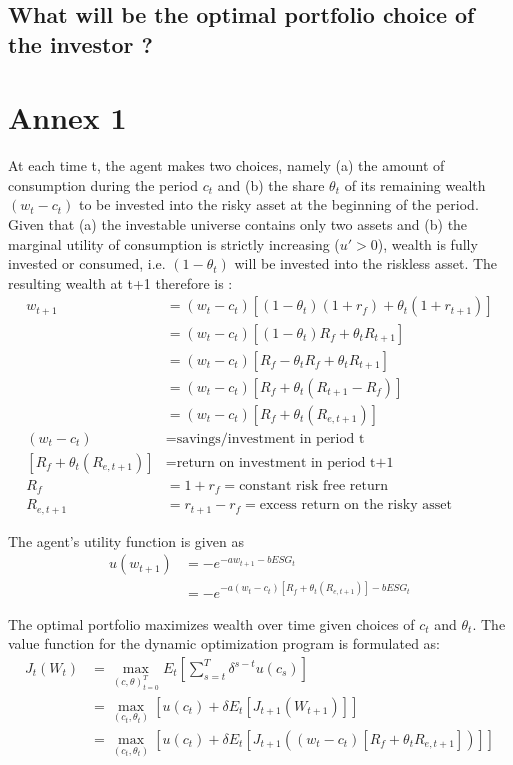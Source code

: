 \documentclass[]{article}
\begin{document}
\subsection{What will be the optimal portfolio choice of the investor ?}


\section{Annex 1}
At each time t, the agent makes two choices, namely (a) the amount of consumption during the period $c_t$ and (b) the share $\theta_t$ of its remaining wealth $(w_t - c_t)$ to be invested into the risky asset at the beginning of the period. Given that (a) the investable universe contains only two assets and (b) the marginal utility of consumption is strictly increasing ($u'>0$), wealth is fully invested or consumed, i.e. $(1-\theta_t)$ will be invested into the riskless asset. The resulting wealth at t+1 therefore is :
\begin{align*}
	w_{t+1} &= (w_t - c_t)\left[(1-\theta_t)(1+r_f)+ \theta_t(1+r_{t+1}) \right]\\
	&= (w_t - c_t)[(1-\theta_t)R_f + \theta_t R_{t+1}]\\
	&= (w_t - c_t)[R_f-\theta_t R_f + \theta_t R_{t+1}]\\
	&= (w_t - c_t)[R_f + \theta_t (R_{t+1} - R_f) ]\\
	&= (w_t - c_t)[R_f + \theta_t (R_{e, t+1})]\\
	(w_t - c_t) &= \text{savings/investment in period t}\\
	[R_f + \theta_t (R_{e, t+1}) ] &= \text{return on investment in period t+1}\\
	R_f &= 1+r_f = \text{constant risk free return}\\
	R_{e, t+1} &= r_{t+1} - r_f = \text{excess return on the risky asset}
\end{align*}

The agent's utility function is given as 
\begin{align*}
	u(w_{t+1}) &= -e^{-aw_{t+1}-bESG_t}\\
	&= -e^{-a (w_t - c_t)[R_f + \theta_t (R_{e, t+1})] -bESG_t}
\end{align*}

\newpage
The optimal portfolio maximizes wealth over time given choices of $c_t$ and $\theta_t$. The value function for the dynamic optimization program is formulated as:
\begin{align*}
	J_t(W_t) &= \max_{(c, \theta)_{t=0}^T} E_t \left[\sum_{s=t}^{T} \delta^{s-t}u(c_s)\right]\\
	&= \max_{(c_t, \theta_t)} \left[u(c_t) + \delta E_t\left[J_{t+1}(W_{t+1})\right]\right]\\
	&= \max_{(c_t, \theta_t)} \left[u(c_t) + \delta E_t\left[J_{t+1}((w_t - c_t)[R_f + \theta_t R_{e, t+1} ])\right]\right]
\end{align*}
\end{document}
